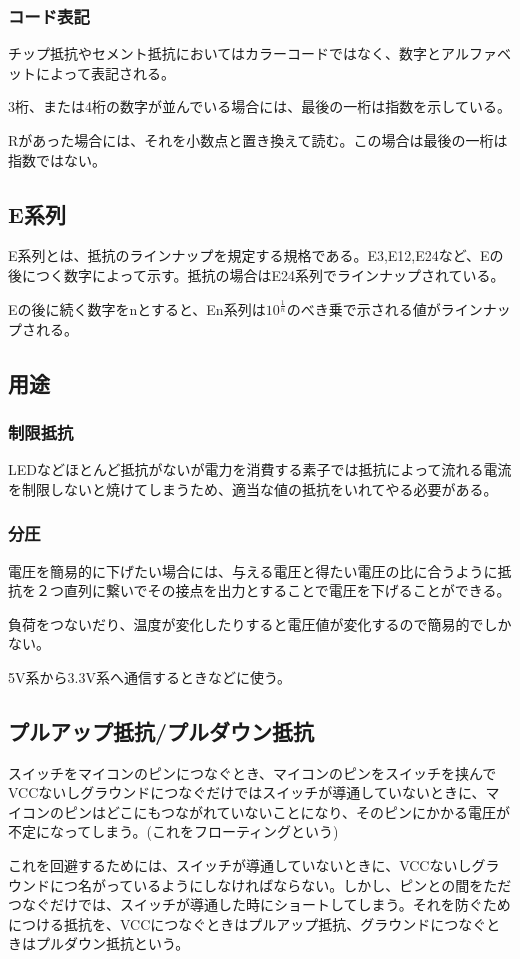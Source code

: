 \documentclass[a4paper,titlepage,here]{ujarticle}
\begin{document}
\subsubsection{コード表記}
チップ抵抗やセメント抵抗においてはカラーコードではなく、数字とアルファベットによって表記される。

3桁、または4桁の数字が並んでいる場合には、最後の一桁は指数を示している。

Rがあった場合には、それを小数点と置き換えて読む。この場合は最後の一桁は指数ではない。
\subsection{E系列}
E系列とは、抵抗のラインナップを規定する規格である。E3,E12,E24など、Eの後につく数字によって示す。抵抗の場合はE24系列でラインナップされている。

Eの後に続く数字をnとすると、En系列は$10^{\frac{1}{n}}$のべき乗で示される値がラインナップされる。
\subsection{用途}
\subsubsection{制限抵抗}
LEDなどほとんど抵抗がないが電力を消費する素子では抵抗によって流れる電流を制限しないと焼けてしまうため、適当な値の抵抗をいれてやる必要がある。
\subsubsection{分圧}
電圧を簡易的に下げたい場合には、与える電圧と得たい電圧の比に合うように抵抗を２つ直列に繋いでその接点を出力とすることで電圧を下げることができる。

負荷をつないだり、温度が変化したりすると電圧値が変化するので簡易的でしかない。

5V系から3.3V系へ通信するときなどに使う。
\subsection{プルアップ抵抗/プルダウン抵抗}
スイッチをマイコンのピンにつなぐとき、マイコンのピンをスイッチを挟んでVCCないしグラウンドにつなぐだけではスイッチが導通していないときに、マイコンのピンはどこにもつながれていないことになり、そのピンにかかる電圧が不定になってしまう。(これをフローティングという)

これを回避するためには、スイッチが導通していないときに、VCCないしグラウンドにつ名がっているようにしなければならない。しかし、ピンとの間をただつなぐだけでは、スイッチが導通した時にショートしてしまう。それを防ぐためにつける抵抗を、VCCにつなぐときはプルアップ抵抗、グラウンドにつなぐときはプルダウン抵抗という。
\end{document}
